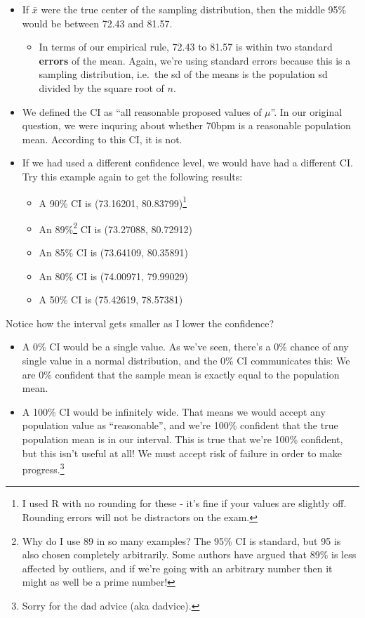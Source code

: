\documentclass[
  letterpaper,
  DIV=11,
  numbers=noendperiod,
  oneside]{scrreprt}
\providecommand{\tightlist}{%
  \setlength{\itemsep}{0pt}\setlength{\parskip}{0pt}}\usepackage{longtable,booktabs,array}
\begin{document}
\begin{itemize}
\tightlist
\item
  If \(\bar x\) were the true center of the sampling distribution, then
  the middle 95\% would be between 72.43 and 81.57.

  \begin{itemize}
  \tightlist
  \item
    In terms of our empirical rule, 72.43 to 81.57 is within two
    standard \textbf{errors} of the mean. Again, we're using standard
    errors because this is a sampling distribution, i.e.~the sd of the
    means is the population sd divided by the square root of \(n\).
  \end{itemize}
\item
  We defined the CI as ``all reasonable proposed values of \(\mu\)''. In
  our original question, we were inquring about whether 70bpm is a
  reasonable population mean. According to this CI, it is not.
\item
  If we had used a different confidence level, we would have had a
  different CI. Try this example again to get the following results:

  \begin{itemize}
  \tightlist
  \item
    A 90\% CI is (73.16201, 80.83799)\footnote{I used R with no rounding
      for these - it's fine if your values are slightly off. Rounding
      errors will not be distractors on the exam.}
  \item
    An 89\%\footnote{Why do I use 89 in so many examples? The 95\% CI is
      standard, but 95 is also chosen completely arbitrarily. Some
      authors have argued that 89\% is less affected by outliers, and if
      we're going with an arbitrary number then it might as well be a
      prime number!} CI is (73.27088, 80.72912)
  \item
    An 85\% CI is (73.64109, 80.35891)
  \item
    An 80\% CI is (74.00971, 79.99029)
  \item
    A 50\% CI is (75.42619, 78.57381)
  \end{itemize}
\end{itemize}

Notice how the interval gets smaller as I lower the confidence?

\begin{itemize}
\tightlist
\item
  A 0\% CI would be a single value. As we've seen, there's a 0\% chance
  of any single value in a normal distribution, and the 0\% CI
  communicates this: We are 0\% confident that the sample mean is
  exactly equal to the population mean.
\item
  A 100\% CI would be infinitely wide. That means we would accept any
  population value as ``reasonable'', and we're 100\% confident that the
  true population mean is in our interval. This is true that we're 100\%
  confident, but this isn't useful at all! We must accept risk of
  failure in order to make progress.\footnote{Sorry for the dad advice
    (aka dadvice).}
\end{itemize}
\end{document}
